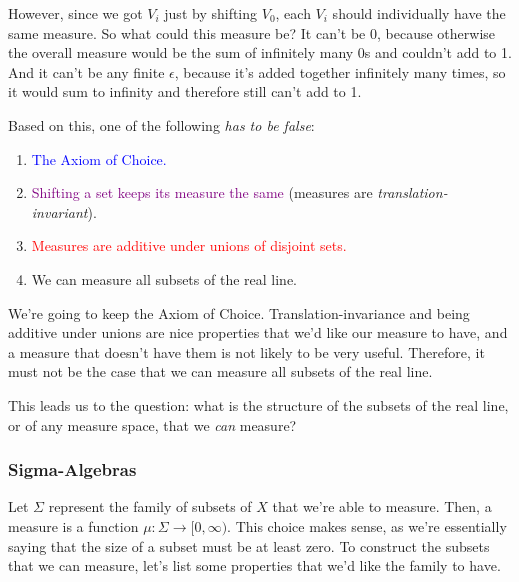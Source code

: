 \documentclass[./analysis.tex]{subfiles}
\begin{document}
    However, since we got $V_i$ just by shifting $V_0$, each $V_i$ should individually have the same measure. So what could this measure be? It can't be 0, because otherwise the overall measure would be the sum of infinitely many 0s and couldn't add to 1. And it can't be any finite $\epsilon$, because it's added together infinitely many times, so it would sum to infinity and therefore still can't add to 1. 

    Based on this, one of the following \emph{has to be false}:

    \begin{enumerate}
        \setlength\itemsep{1pt}
        \item \textcolor{blue}{The Axiom of Choice.}
        \item \textcolor{purple}{Shifting a set keeps its measure the same} (measures are \emph{translation-invariant}).
        \item \textcolor{red}{Measures are additive under unions of disjoint sets.}
        \item We can measure all subsets of the real line.
    \end{enumerate}

    We're going to keep the Axiom of Choice. Translation-invariance and being additive under unions are nice properties that we'd like our measure to have, and a measure that doesn't have them is not likely to be very useful. Therefore, it must not be the case that we can measure all subsets of the real line. 

    This leads us to the question: what is the structure of the subsets of the real line, or of any measure space, that we \emph{can} measure?

    \subsubsection{Sigma-Algebras}

    Let $\Sigma$ represent the family of subsets of $X$ that we're able to measure. Then, a measure is a function $\mu: \Sigma \to [0, \infty)$. This choice makes sense, as we're essentially saying that the size of a subset must be at least zero. To construct the subsets that we can measure, let's list some properties that we'd like the family to have. 
\end{document}
